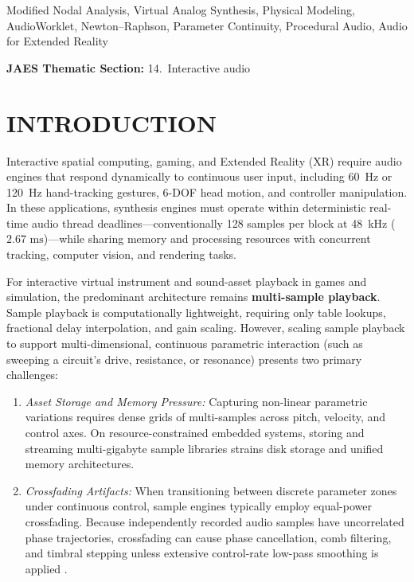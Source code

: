 \documentclass[fleqn,final]{jaes}
\begin{document}
\begin{keywords}
Modified Nodal Analysis, Virtual Analog Synthesis, Physical Modeling, AudioWorklet, Newton--Raphson, Parameter Continuity, Procedural Audio, Audio for Extended Reality
\end{keywords}

\noindent\textbf{JAES Thematic Section:} 14.~Interactive audio

\section{INTRODUCTION}

Interactive spatial computing, gaming, and Extended Reality (XR) require audio engines that respond dynamically to continuous user input, including 60~Hz or 120~Hz hand-tracking gestures, 6-DOF head motion, and controller manipulation. In these applications, synthesis engines must operate within deterministic real-time audio thread deadlines---conventionally 128 samples per block at 48~kHz ($2.67\text{ ms}$)---while sharing memory and processing resources with concurrent tracking, computer vision, and rendering tasks.

For interactive virtual instrument and sound-asset playback in games and simulation, the predominant architecture remains \textbf{multi-sample playback}. Sample playback is computationally lightweight, requiring only table lookups, fractional delay interpolation, and gain scaling. However, scaling sample playback to support multi-dimensional, continuous parametric interaction (such as sweeping a circuit's drive, resistance, or resonance) presents two primary challenges:
\begin{enumerate}
\item \textit{Asset Storage and Memory Pressure:} Capturing non-linear parametric variations requires dense grids of multi-samples across pitch, velocity, and control axes. On resource-constrained embedded systems, storing and streaming multi-gigabyte sample libraries strains disk storage and unified memory architectures.
\item \textit{Crossfading Artifacts:} When transitioning between discrete parameter zones under continuous control, sample engines typically employ equal-power crossfading. Because independently recorded audio samples have uncorrelated phase trajectories, crossfading can cause phase cancellation, comb filtering, and timbral stepping unless extensive control-rate low-pass smoothing is applied \cite{serafin2016virtual, turchet2021smart}.
\end{enumerate}
\end{document}
